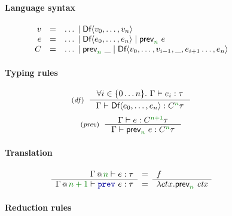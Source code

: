 \begin{figure}[t]
\paragraph{Language syntax}

\begin{equation*}
\begin{array}{rcl}
v &=& \ldots \sep \ident{Df}\langle v_0, \ldots, v_n\rangle \\
e &=& \ldots \sep \ident{Df}\langle e_0, \ldots, e_n\rangle \sep \ident{prev}_{\cclrd{n}}~e\\
C &=& \ldots \sep \ident{prev}_{\cclrd{n}}~\_ \sep \ident{Df}\langle v_0, \ldots, v_{i-1}, \_, e_{i+1} \ldots, e_n\rangle
\end{array}  
\end{equation*}

\vspace{1.25em}
\paragraph{Typing rules}

\begin{equation*}
\tyrule{df}
  { \forall i\in\{ 0 \ldots n \}. ~ \Gamma \vdash e_i : \tau}
  { \Gamma \vdash \ident{Df}\langle e_0, \ldots, e_n \rangle : \ctyp{\cclrd{n}}{\tau} }
\end{equation*}
\begin{equation*}
\tyrule{prev}
  { \Gamma \vdash e : \ctyp{\cclrd{n+1}}{\tau} }
  { \Gamma \vdash \ident{prev}_{\cclrd{n}}~e : \ctyp{\cclrd{n}}{\tau} }
\end{equation*}

\vspace{1.25em}
\paragraph{Translation}

\begin{equation*}
\semdeff
  { \coctx{\Gamma}{\cclrd{n}} \vdash e : \tau }
  { \coctx{\Gamma}{\cclrd{n+1}} \vdash \kvd{prev}~e : \tau }
  {f}
  {\lambda ctx.\ident{prev}_{\cclrd{n}}~\ctx }
\end{equation*}

\vspace{1.25em}
\paragraph{Reduction rules}


\end{figure}
